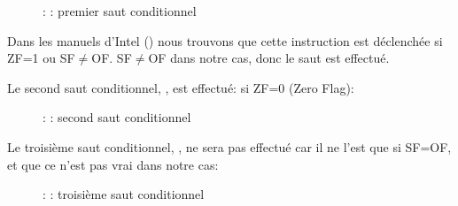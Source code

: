 \begin{figure}[H]
\centering
{}
\caption{\olly: : premier saut conditionnel}
\label{fig:jcc_olly_signed_1}
\end{figure}

Dans les manuels d'Intel () nous trouvons que cette instruction
est déclenchée si ZF=1 ou SF$\neq$OF.
SF$\neq$OF dans notre cas, donc le saut est effectué.

\clearpage
Le second saut conditionnel, \JNZ, est effectué: si ZF=0 (Zero Flag):

\begin{figure}[H]
\centering
{}
\caption{\olly: : second saut conditionnel}
\label{fig:jcc_olly_signed_2}
\end{figure}

\clearpage
Le troisième saut conditionnel, \JGE, ne sera pas effectué car il ne l'est que
si SF=OF, et que ce n'est pas vrai dans notre cas:

\begin{figure}[H]
\centering
{}
\caption{\olly: : troisième saut conditionnel}
\label{fig:jcc_olly_signed_3}
\end{figure}
